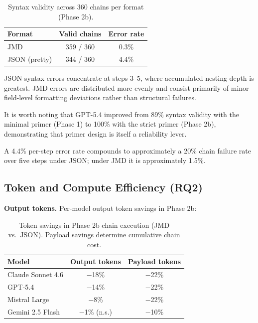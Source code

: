 \documentclass[11pt]{article}
\begin{document}
\begin{table}[h]
  \centering
  \begin{tabular}{lcc}
    \toprule
    \textbf{Format} & \textbf{Valid chains} & \textbf{Error rate} \\
    \midrule
    JMD             & 359 / 360             & 0.3\%               \\
    JSON (pretty)   & 344 / 360             & 4.4\%               \\
    \bottomrule
  \end{tabular}
  \caption{Syntax validity across 360 chains per format (Phase 2b).}
\end{table}

JSON syntax errors concentrate at steps 3--5, where accumulated nesting depth is greatest. JMD errors are distributed more evenly and consist primarily of minor field-level formatting deviations rather than structural failures.

It is worth noting that GPT-5.4 improved from 89\% syntax validity with the minimal primer (Phase 1) to 100\% with the strict primer (Phase 2b), demonstrating that primer design is itself a reliability lever.

A 4.4\% per-step error rate compounds to approximately a 20\% chain failure rate over five steps under JSON; under JMD it is approximately 1.5\%.

\subsection{Token and Compute Efficiency (RQ2)}

\textbf{Output tokens.} Per-model output token savings in Phase 2b:

\begin{table}[h]
  \centering
  \small
  \begin{tabular}{lcc}
    \toprule
    \textbf{Model}    & \textbf{Output tokens} & \textbf{Payload tokens} \\
    \midrule
    Claude Sonnet 4.6 & $-$18\%                & $-$22\%                 \\
    GPT-5.4           & $-$14\%                & $-$22\%                 \\
    Mistral Large     & $-$8\%                 & $-$22\%                 \\
    Gemini 2.5 Flash  & $-$1\% (n.s.)          & $-$10\%                 \\
    \bottomrule
  \end{tabular}
  \caption{Token savings in Phase 2b chain execution (JMD vs.\ JSON). Payload savings determine cumulative chain cost.}
\end{table}
\end{document}
